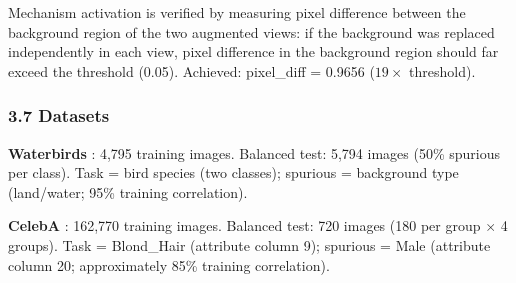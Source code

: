 Mechanism activation is verified by measuring pixel difference between the background region of the two augmented views: if the background was replaced independently in each view, pixel difference in the background region should far exceed the threshold (0.05). Achieved: pixel\_diff = 0.9656 ($19\times$ threshold).

\subsubsection{3.7 Datasets}

\textbf{Waterbirds} \citep{Sagawa2020GroupDRO}: 4,795 training images. Balanced test: 5,794 images (50\% spurious per class). Task = bird species (two classes); spurious = background type (land/water; 95\% training correlation).

\textbf{CelebA} \citep{Liu2015CelebA}: 162,770 training images. Balanced test: 720 images (180 per group $\times$ 4 groups). Task = Blond\_Hair (attribute column 9); spurious = Male (attribute column 20; approximately 85\% training correlation).

